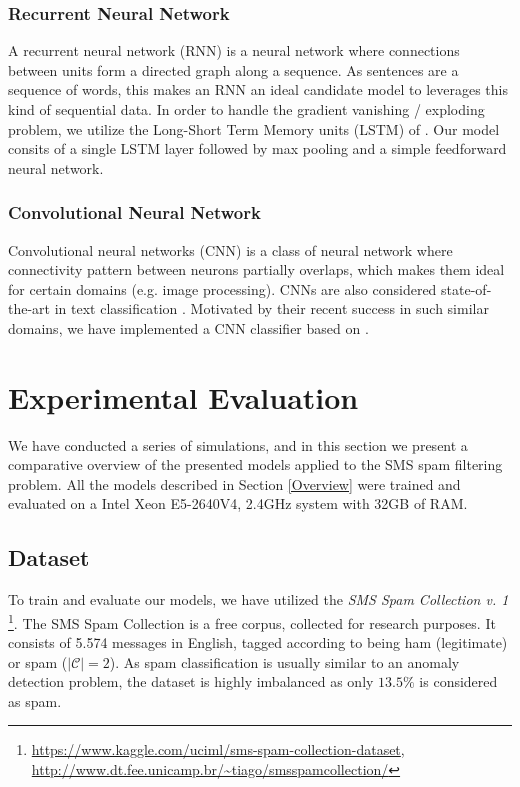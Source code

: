\documentclass[letterpaper]{article}
\begin{document}
\subsubsection{Recurrent Neural Network} \label{Recurrent Neural Network}

A recurrent neural network (RNN) is a neural network where connections between units form a directed graph along a sequence. As sentences are a sequence of words, this makes an RNN an ideal candidate model to leverages this kind of sequential data. In order to handle the gradient vanishing / exploding problem, we utilize the Long-Short Term Memory units (LSTM) of \cite{hochreiter1997long}. Our model consits of a single LSTM layer followed by max pooling and a simple feedforward neural network.

\subsubsection{Convolutional Neural Network} \label{Convolutional Neural Network}

Convolutional neural networks (CNN) is a class of neural network where connectivity pattern between neurons partially overlaps, which makes them ideal for certain domains (e.g. image processing). CNNs are also considered state-of-the-art in text classification \cite{CaoLLW17} \cite{kim2014convolutional} \cite{zhang2015understanding} \cite{XiaoC16}. Motivated by their recent success in such similar domains, we have implemented a CNN classifier based on \cite{kim2014convolutional}.

\section{Experimental Evaluation} \label{Experimental Evaluation}

We have conducted a series of simulations, and in this section we present a comparative overview of the presented models applied to the SMS spam filtering problem. All the models described in Section \ref{Overview} were trained and evaluated on a Intel Xeon E5-2640V4, 2.4GHz system with 32GB of RAM.

\subsection{Dataset}  \label{Dataset}

To train and evaluate our models, we have utilized the \emph{SMS Spam Collection v. 1} \footnote{\url{https://www.kaggle.com/uciml/sms-spam-collection-dataset}, \\ \url{http://www.dt.fee.unicamp.br/~tiago/smsspamcollection/}}. The SMS Spam Collection is a free corpus, collected for research purposes. It consists of 5.574 messages in English, tagged according to being ham (legitimate) or spam ($|\mathcal{C}| = 2$). As spam classification is usually similar to an anomaly detection problem, the dataset is highly imbalanced as only $13.5\%$ is considered as spam.
\end{document}
